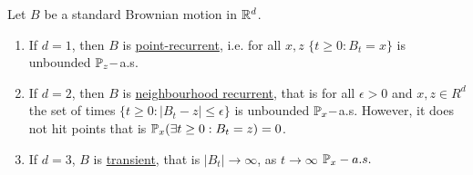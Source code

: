 \documentclass{article}
\begin{document}
\begin{theorem}\label{thm: bm recurrence and transience}
Let $ B$ be a standard Brownian motion in $ \mathbb{R}^{d}$.\\ 

\begin{enumerate}
		\item If $ d=1$, then $ B$ is \underline{point-recurrent}, i.e. for all $ x,z$ $ \{t\geq 0: B_{t} = x\}$ is unbounded $ \mathbb{P}_{z}-$a.s. \\ 
		\item If $ d = 2$, then $ B$ is \underline{neighbourhood recurrent}, that is for all $ \epsilon >0$ and $ x, z\in R^{d}$ the set of times $ \{t\geq 0 : |B_{t}-z|\leq \epsilon\}$ is unbounded $ \mathbb{P}_{x}-$a.s. However, it does not hit points that is $ \mathbb{P}_{x}(\exists t\geq 0: B_{t} = z)=0$. 
		\item If $ d=3$, $ B$ is \underline{transient}, that is $ |B_{t}|\to \infty$, as $ t\to \infty$ $ \mathbb{P}_{x}-a.s.$
\end{enumerate}

\end{theorem}
\end{document}
